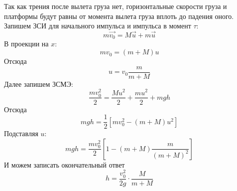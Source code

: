 \documentclass[a5paper,10pt]{article}
\begin{document}
Так как трения после вылета груза нет, горизонтальные скорости груза и платформы будут равны от момента вылета груза вплоть до падения оного.
Запишем ЗСИ для начального импульса и импульса в момент $\tau$:
\begin{equation}
    m\vec{v_0}=M\vec{u}+m\vec{u}
\end{equation}
В проекции на $x$:
\begin{equation}
    m{v_0}=(m+M)u
\end{equation}
Отсюда
\begin{equation}
    u=v_0\frac{m}{m+M}
\end{equation}
Далее запишем ЗСМЭ:
\begin{equation}
    \frac{mv_0^2}{2}=\frac{Mu^2}{2}+\frac{mu^2}{2}+mgh
\end{equation}
Отсюда
\begin{equation}
    mgh=\frac{1}{2}\left[mv_0^2-(m+M)u^2\right]
\end{equation}
Подставляя $u$:
\begin{equation}
    mgh=\frac{mv_0^2}{2}\left[1-(m+M)\frac{m}{(m+M)^2}\right]
\end{equation}
И можем записать окончательный ответ
\begin{equation}
    h=\frac{v_0^2}{2g}\cdot\frac{M}{m+M}
\end{equation}


\end{document}
